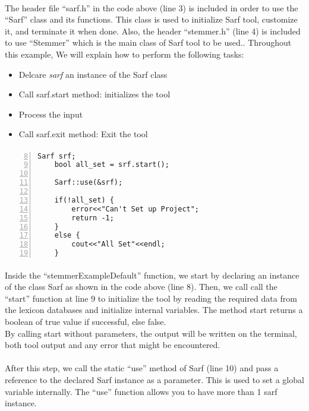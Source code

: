 \documentclass{article}
\begin{document}
\paragraph{}
The header file ``sarf.h'' in the code above (line 3) is included in order to use the ``Sarf'' class and its functions. This class is used to initialize Sarf tool, customize it, and terminate it when done. Also, the header ``stemmer.h'' (line 4) is included to use ``Stemmer'' which is the main class of Sarf tool to be used.. Throughout this example, We will explain how to perform the following tasks:

\begin{itemize}
\item Delcare {\em sarf}  an instance of the Sarf class
\item Call {sarf.start } method: initializes the tool
\item Process the input
\item Call {sarf.exit } method: Exit the tool
\end{itemize}

\paragraph{}
\begin{Verbatim}[numbers=left,firstnumber=8]
    Sarf srf;
    bool all_set = srf.start();

    Sarf::use(&srf);

    if(!all_set) {
        error<<"Can't Set up Project";
        return -1;
    }
    else {
        cout<<"All Set"<<endl;
    }
\end{Verbatim}

\paragraph{}
Inside the ``stemmerExampleDefault'' function, we start by declaring an instance of the class Sarf as shown in the code above (line 8). Then, we call call the ``start'' function at line 9 to initialize the tool by reading the required data from the lexicon databases and initialize internal variables. The method start returns a boolean of true value if successful, else false.\\

By calling start without parameters, the output will be written on the terminal, both tool output and any error that might be encountered.

\paragraph{}
After this step, we call the static ``use'' method of Sarf (line 10) and pass a reference to the declared Sarf instance as a parameter. This is used to set a global variable internally. The ``use'' function allows you to have more than 1 sarf instance.
\end{document}
